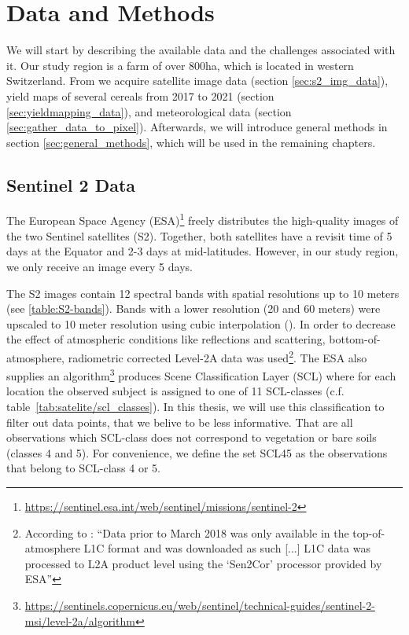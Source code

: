 \chapter{Data and Methods}\label{sec:data_methods}
{
	We will start by describing the available data and the challenges associated with it.
	Our study region is a farm of over 800ha, which is located in western Switzerland. From \cite{perichPixelbasedCropYield2022}  we acquire satellite image data (section \ref{sec:s2_img_data}), yield maps of several cereals from 2017 to 2021 (section \ref{sec:yieldmapping_data}), and meteorological data (section \ref{sec:gather_data_to_pixel}).
	Afterwards, we will introduce general methods in section \ref{sec:general_methods}, which will be used in the remaining chapters.
}


\section{Sentinel 2 Data}{
	\label{sec:s2_img_data}
	{
		The European Space Agency (ESA)\footnote{\url{https://sentinel.esa.int/web/sentinel/missions/sentinel-2}} freely distributes the high-quality images of the two Sentinel satellites (S2). Together, both satellites have a revisit time of 5 days at the Equator and 2-3 days at mid-latitudes. However, in our study region, we only receive an image every 5 days.
		
		
		
		The S2 images contain 12 spectral bands with spatial resolutions up to 10 meters (see \ref{table:S2-bands}). Bands with a lower resolution (20 and 60 meters) were upscaled to 10 meter resolution using cubic interpolation (\cite{perichPixelbasedCropYield2022}). In order to decrease the effect of atmospheric conditions like reflections and scattering, bottom-of-atmosphere, radiometric corrected Level-2A data was used\footnote{According to \cite{perichPixelbasedCropYield2022}: ``Data prior to March 2018 was only available in the top-of-atmosphere L1C format and was downloaded as such [...] L1C data was processed to L2A product level using the `Sen2Cor' processor provided by ESA''}. 
		The ESA also supplies an algorithm\footnote{\url{https://sentinels.copernicus.eu/web/sentinel/technical-guides/sentinel-2-msi/level-2a/algorithm}} produces Scene Classification Layer ({SCL}) where for each location the observed subject is assigned to one of 11 SCL-classes (c.f. table~\ref{tab:satelite/scl_classes}). 
		In this thesis,  we will use this classification to filter out data points, that we belive to be less informative. That are all observations which SCL-class does not correspond to vegetation or bare soils (classes 4 and 5). For convenience, we define the set SCL45 as the observations that belong to SCL-class 4 or 5.
		
}}
